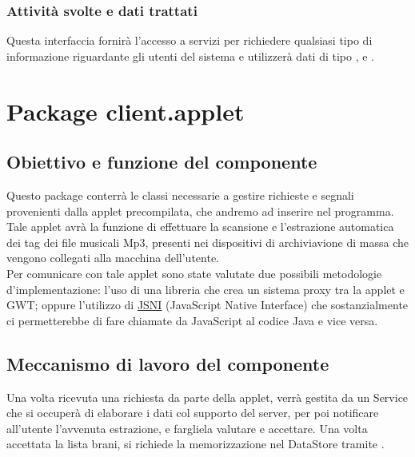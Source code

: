 \subsubsection*{Attivit\`a svolte e dati trattati}
Questa interfaccia fornir\`a l'accesso a servizi per richiedere qualsiasi tipo
di informazione riguardante gli utenti del sistema e utilizzer\`a dati di tipo
,  e .


\section{Package client.applet} %
\subsection*{Obiettivo e funzione del componente}
Questo package conterr\`a le classi necessarie a gestire richieste e segnali
provenienti dalla applet precompilata, che andremo ad inserire nel programma.
Tale applet avr\`a la funzione di effettuare la scansione e l'estrazione
automatica dei tag dei file musicali Mp3, presenti nei dispositivi di
archiviavione di massa che vengono collegati alla macchina dell'utente.\\
Per comunicare con tale applet sono state valutate due possibili metodologie
d'implementazione: l'uso di una libreria che crea un sistema proxy tra la applet
e GWT; oppure l'utilizzo di \underline{JSNI} (JavaScript Native Interface) che
sostanzialmente ci permetterebbe di fare chiamate da JavaScript al codice Java e
vice versa.

\subsection*{Meccanismo di lavoro del componente}
Una volta ricevuta una richiesta da parte della applet, verr\`a gestita da un
Service che si occuper\`a di elaborare i dati col supporto del server, per poi
notificare all'utente l'avvenuta estrazione, e fargliela valutare e accettare.
Una volta accettata la lista brani, si richiede la memorizzazione nel DataStore
tramite .


\newpage
